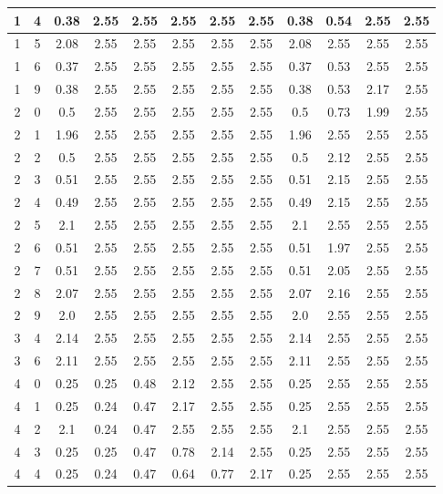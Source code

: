 \begin{longtable}{|c|c||c||c|c|c|c|c||c|c|c|c|}
	1 & 4 & 0.38 & 2.55 & 2.55 & 2.55 & 2.55 & 2.55 & 0.38 & 0.54 & 2.55 & 2.55 \\ \hline
	1 & 5 & 2.08 & 2.55 & 2.55 & 2.55 & 2.55 & 2.55 & 2.08 & 2.55 & 2.55 & 2.55 \\ \hline
	1 & 6 & 0.37 & 2.55 & 2.55 & 2.55 & 2.55 & 2.55 & 0.37 & 0.53 & 2.55 & 2.55 \\ \hline
	1 & 9 & 0.38 & 2.55 & 2.55 & 2.55 & 2.55 & 2.55 & 0.38 & 0.53 & 2.17 & 2.55 \\ \hline
	2 & 0 & 0.5 & 2.55 & 2.55 & 2.55 & 2.55 & 2.55 & 0.5 & 0.73 & 1.99 & 2.55 \\ \hline
	2 & 1 & 1.96 & 2.55 & 2.55 & 2.55 & 2.55 & 2.55 & 1.96 & 2.55 & 2.55 & 2.55 \\ \hline
	2 & 2 & 0.5 & 2.55 & 2.55 & 2.55 & 2.55 & 2.55 & 0.5 & 2.12 & 2.55 & 2.55 \\ \hline
	2 & 3 & 0.51 & 2.55 & 2.55 & 2.55 & 2.55 & 2.55 & 0.51 & 2.15 & 2.55 & 2.55 \\ \hline
	2 & 4 & 0.49 & 2.55 & 2.55 & 2.55 & 2.55 & 2.55 & 0.49 & 2.15 & 2.55 & 2.55 \\ \hline
	2 & 5 & 2.1 & 2.55 & 2.55 & 2.55 & 2.55 & 2.55 & 2.1 & 2.55 & 2.55 & 2.55 \\ \hline
	2 & 6 & 0.51 & 2.55 & 2.55 & 2.55 & 2.55 & 2.55 & 0.51 & 1.97 & 2.55 & 2.55 \\ \hline
	2 & 7 & 0.51 & 2.55 & 2.55 & 2.55 & 2.55 & 2.55 & 0.51 & 2.05 & 2.55 & 2.55 \\ \hline
	2 & 8 & 2.07 & 2.55 & 2.55 & 2.55 & 2.55 & 2.55 & 2.07 & 2.16 & 2.55 & 2.55 \\ \hline
	2 & 9 & 2.0 & 2.55 & 2.55 & 2.55 & 2.55 & 2.55 & 2.0 & 2.55 & 2.55 & 2.55 \\ \hline
	3 & 4 & 2.14 & 2.55 & 2.55 & 2.55 & 2.55 & 2.55 & 2.14 & 2.55 & 2.55 & 2.55 \\ \hline
	3 & 6 & 2.11 & 2.55 & 2.55 & 2.55 & 2.55 & 2.55 & 2.11 & 2.55 & 2.55 & 2.55 \\ \hline
	4 & 0 & 0.25 & 0.25 & 0.48 & 2.12 & 2.55 & 2.55 & 0.25 & 2.55 & 2.55 & 2.55 \\ \hline
	4 & 1 & 0.25 & 0.24 & 0.47 & 2.17 & 2.55 & 2.55 & 0.25 & 2.55 & 2.55 & 2.55 \\ \hline
	4 & 2 & 2.1 & 0.24 & 0.47 & 2.55 & 2.55 & 2.55 & 2.1 & 2.55 & 2.55 & 2.55 \\ \hline
	4 & 3 & 0.25 & 0.25 & 0.47 & 0.78 & 2.14 & 2.55 & 0.25 & 2.55 & 2.55 & 2.55 \\ \hline
	4 & 4 & 0.25 & 0.24 & 0.47 & 0.64 & 0.77 & 2.17 & 0.25 & 2.55 & 2.55 & 2.55 \\ \hline

\end{longtable}
